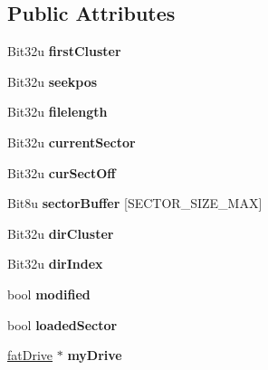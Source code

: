\subsection*{Public Attributes}
\begin{DoxyCompactItemize}
\item 
\hypertarget{classfatFile_a0ab23d013d75299668159f7b5acfc20f}{Bit32u {\bfseries first\-Cluster}}\label{classfatFile_a0ab23d013d75299668159f7b5acfc20f}

\item 
\hypertarget{classfatFile_a5dfa3257680a81dc52f63616739d3b7b}{Bit32u {\bfseries seekpos}}\label{classfatFile_a5dfa3257680a81dc52f63616739d3b7b}

\item 
\hypertarget{classfatFile_ae14c4b0d1d3ba4940fd097128b8c9717}{Bit32u {\bfseries filelength}}\label{classfatFile_ae14c4b0d1d3ba4940fd097128b8c9717}

\item 
\hypertarget{classfatFile_a10d126dd6ea8e86ba96691e70f4d3795}{Bit32u {\bfseries current\-Sector}}\label{classfatFile_a10d126dd6ea8e86ba96691e70f4d3795}

\item 
\hypertarget{classfatFile_a310779605ffff594badf8dfb72738d36}{Bit32u {\bfseries cur\-Sect\-Off}}\label{classfatFile_a310779605ffff594badf8dfb72738d36}

\item 
\hypertarget{classfatFile_abdc7747a29ed56ef531c69e9a11ab6b1}{Bit8u {\bfseries sector\-Buffer} \mbox{[}S\-E\-C\-T\-O\-R\-\_\-\-S\-I\-Z\-E\-\_\-\-M\-A\-X\mbox{]}}\label{classfatFile_abdc7747a29ed56ef531c69e9a11ab6b1}

\item 
\hypertarget{classfatFile_a1496430cf7bc1f1d681fd66d08e12b5e}{Bit32u {\bfseries dir\-Cluster}}\label{classfatFile_a1496430cf7bc1f1d681fd66d08e12b5e}

\item 
\hypertarget{classfatFile_a0747fdfbf56e3cf6e6b91e9bb1b8a866}{Bit32u {\bfseries dir\-Index}}\label{classfatFile_a0747fdfbf56e3cf6e6b91e9bb1b8a866}

\item 
\hypertarget{classfatFile_a9108545ee15a1eb3c63ffac2d1a6d37e}{bool {\bfseries modified}}\label{classfatFile_a9108545ee15a1eb3c63ffac2d1a6d37e}

\item 
\hypertarget{classfatFile_ab7a7ff61e54c4ffa6c303924cd685c29}{bool {\bfseries loaded\-Sector}}\label{classfatFile_ab7a7ff61e54c4ffa6c303924cd685c29}

\item 
\hypertarget{classfatFile_ac3d9bcecc8822018478fa69b54e0367f}{\hyperlink{classfatDrive}{fat\-Drive} $\ast$ {\bfseries my\-Drive}}\label{classfatFile_ac3d9bcecc8822018478fa69b54e0367f}

\end{DoxyCompactItemize}


